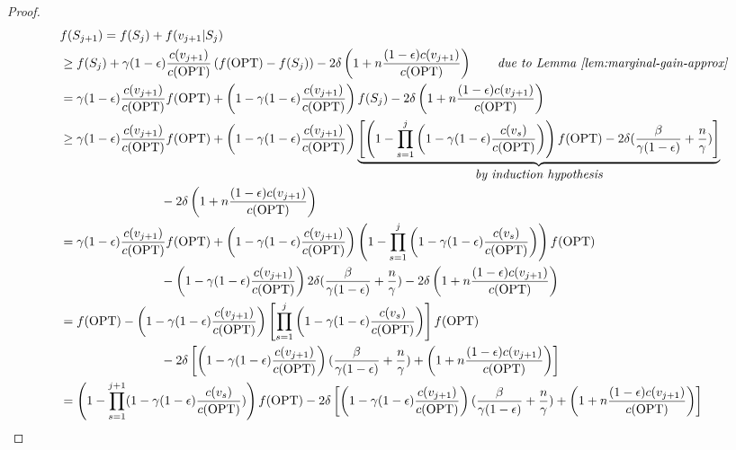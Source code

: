 \documentclass[10pt]{article} %
\theoremstyle{remark}
\newcommand{\OPT}{{\rm OPT}}
\begin{document}
\begin{proof}
    \begin{align*}
        &f(S_{j+1}) = f(S_j)+f(v_{j+1}|S_j)\\
        &\geq f(S_j) + \gamma(1-\epsilon) \frac{c(v_{j+1})}{c(\OPT)} \left( f(\OPT) - f(S_j) \right) - 2\delta  \left( 1+n\frac{(1-\epsilon)c(v_{j+1})}{ c(\OPT)} \right)  \quad\quad\mbox{\it due to Lemma~\ref{lem:marginal-gain-approx}}\\
        &= \gamma(1-\epsilon) \frac{c(v_{j+1})}{c(\OPT)}f(\OPT) + \left(1-\gamma(1-\epsilon) \frac{c(v_{j+1})}{c(\OPT)} \right) f(S_j) - 2\delta  \left( 1+n\frac{(1-\epsilon)c(v_{j+1})}{ c(\OPT)} \right) \\
        &\geq \gamma(1-\epsilon) \frac{c(v_{j+1})}{c(\OPT)}f(\OPT) + \left(1-\gamma(1-\epsilon) \frac{c(v_{j+1})}{c(\OPT)} \right) \underbrace{\left[\left(   1- \prod_{s=1}^{j} \left(1- \gamma(1-\epsilon) \frac{c(v_s)}{c(\OPT)} \right)   \right)f(\OPT) - 2\delta(\frac{\beta}{\gamma(1-\epsilon)}+\frac{n}{\gamma}) \right]}_{\mbox{\it by induction hypothesis}} \\
        & \ \ \ \ \ \ \ \ \ \ \ \ \ \ \ \ \ \ \ \ \ \ \ \  - 2\delta  \left( 1+n\frac{(1-\epsilon)c(v_{j+1})}{ c(\OPT)} \right) \\
        &= \gamma(1-\epsilon) \frac{c(v_{j+1})}{c(\OPT)}f(\OPT) + \left(1-\gamma(1-\epsilon) \frac{c(v_{j+1})}{c(\OPT)} \right) \left(   1- \prod_{s=1}^{j} \left(1- \gamma(1-\epsilon) \frac{c(v_s)}{c(\OPT)} \right)   \right)f(\OPT)  \\
        & \ \ \ \ \ \ \ \ \ \ \ \ \ \ \ \ \ \ \ \ \ \ \ \ -\left(1-\gamma(1-\epsilon) \frac{c(v_{j+1})}{c(\OPT)} \right) 2\delta(\frac{\beta}{\gamma(1-\epsilon)}+\frac{n}{\gamma})   - 2\delta  \left( 1+n\frac{(1-\epsilon)c(v_{j+1})}{ c(\OPT)} \right)\\
        &= f(\OPT) - \left(1-\gamma(1-\epsilon) \frac{c(v_{j+1})}{c(\OPT)} \right)\left[\prod_{s=1}^{j} \left(1- \gamma(1-\epsilon) \frac{c(v_s)}{c(\OPT)} \right)\right]f(\OPT)\\
        & \ \ \ \ \ \ \ \ \ \ \ \ \ \ \ \ \ \ \ \ \ \ \ \ -2\delta \left[ \left(1-\gamma(1-\epsilon) \frac{c(v_{j+1})}{c(\OPT)} \right)(\frac{\beta}{\gamma(1-\epsilon)}+\frac{n}{\gamma}) +  \left( 1+n\frac{(1-\epsilon)c(v_{j+1})}{ c(\OPT)} \right)\right]  \\
        &= \left( 1- \prod_{s=1}^{j+1} (1- \gamma(1-\epsilon) \frac{c(v_s)}{c(\OPT)} )   \right) f(\OPT) -2\delta \left[ \left(1-\gamma(1-\epsilon) \frac{c(v_{j+1})}{c(\OPT)} \right)(\frac{\beta}{\gamma(1-\epsilon)}+\frac{n}{\gamma}) +  \left( 1+n\frac{(1-\epsilon)c(v_{j+1})}{ c(\OPT)} \right)\right]
    \end{align*} 


\end{proof}
\end{document}
